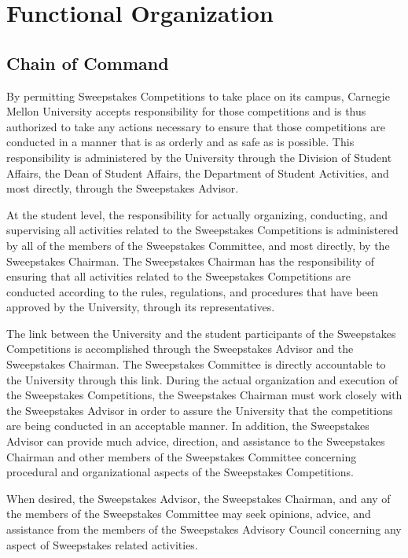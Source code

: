 \documentclass[openany]{book}
\begin{document}
\section{Functional Organization}

\subsection{Chain of Command}

By permitting Sweepstakes Competitions to take place on its campus, Carnegie Mellon University accepts responsibility for those competitions and is thus authorized to take any actions necessary to ensure that those competitions are conducted in a manner that is as orderly and as safe as is possible. This responsibility is administered by the University through the Division of Student Affairs, the Dean of Student Affairs, the Department of Student Activities, and most directly, through the Sweepstakes Advisor.

At the student level, the responsibility for actually organizing, conducting, and supervising all activities related to the Sweepstakes Competitions is administered by all of the members of the Sweepstakes Committee, and most directly, by the Sweepstakes Chairman. The Sweepstakes Chairman has the responsibility of ensuring that all activities related to the Sweepstakes Competitions are conducted according to the rules, regulations, and procedures that have been approved by the University, through its representatives.

The link between the University and the student participants of the Sweepstakes Competitions is accomplished through the Sweepstakes Advisor and the Sweepstakes Chairman. The Sweepstakes Committee is directly accountable to the University through this link. During the actual organization and execution of the Sweepstakes Competitions, the Sweepstakes Chairman must work closely with the Sweepstakes Advisor in order to assure the University that the competitions are being conducted in an acceptable manner. In addition, the Sweepstakes Advisor can provide much advice, direction, and assistance to the Sweepstakes Chairman and other members of the Sweepstakes Committee concerning procedural and organizational aspects of the Sweepstakes Competitions.

When desired, the Sweepstakes Advisor, the Sweepstakes Chairman, and any of the members of the Sweepstakes Committee may seek opinions, advice, and assistance from the members of the Sweepstakes Advisory Council concerning any aspect of Sweepstakes related activities.
\end{document}
